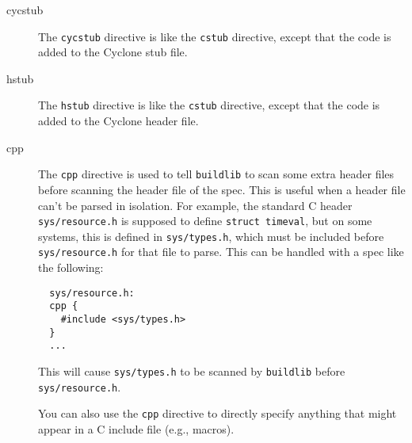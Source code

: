 \begin{description}
\item[cycstub]
The \texttt{cycstub} directive is like the \texttt{cstub} directive,
except that the code is added to the Cyclone stub file.

\item[hstub]
The \texttt{hstub} directive is like the \texttt{cstub} directive,
except that the code is added to the Cyclone header file.

\item[cpp]
The \texttt{cpp} directive is used to tell \texttt{buildlib} to scan
some extra header files before scanning the header file of the spec.
This is useful when a header file can't be parsed in isolation.  For
example, the standard C header \texttt{sys/resource.h} is supposed to
define \texttt{struct timeval}, but on some systems, this is defined
in \texttt{sys/types.h}, which must be included before
\texttt{sys/resource.h} for that file to parse.  This can be handled
with a spec like the following:
\begin{verbatim}
  sys/resource.h:
  cpp {
    #include <sys/types.h>
  }
  ...
\end{verbatim}

This will cause \texttt{sys/types.h} to be scanned by
\texttt{buildlib} before \texttt{sys/resource.h}.

You can also use the \texttt{cpp} directive to directly specify
anything that might appear in a C include file (e.g., macros).
\end{description}

